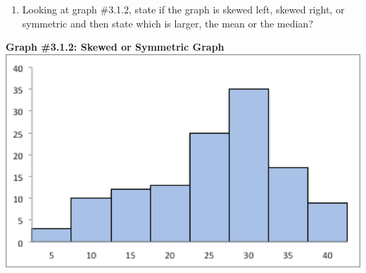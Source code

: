 \documentclass[
]{book}
\providecommand{\tightlist}{%
  \setlength{\itemsep}{0pt}\setlength{\parskip}{0pt}}
\begin{document}
\begin{enumerate}
\def\labelenumi{\arabic{enumi}.}
\setcounter{enumi}{5}
\tightlist
\item
  Looking at graph \#3.1.2, state if the graph is skewed left, skewed right, or symmetric and then state which is larger, the mean or the median?
\end{enumerate}

\textbf{Graph \#3.1.2: Skewed or Symmetric Graph}
\includegraphics{graph_3_1_2.png}
\end{document}
